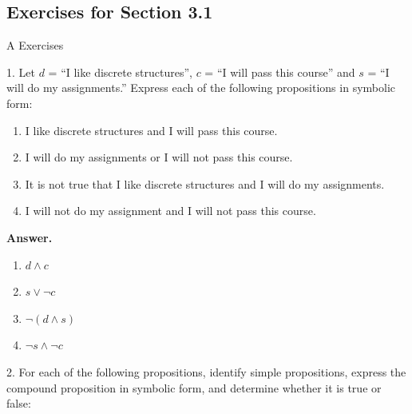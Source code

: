 \documentclass[10pt,]{book}
\theoremstyle{plain}
\theoremstyle{definition}
\theoremstyle{definition}
\theoremstyle{definition}
\theoremstyle{definition}
\begin{document}
\subsection[Exercises for Section 3.1 ]{Exercises for Section 3.1 }\label{exercises-3.1}
\hypertarget{exercisegroup-1}{}\typeout{************************************************}
\typeout{************************************************}
A Exercises%
\begin{exercisegroup}
\item[1.]\hypertarget{exercise-1}{}Let \(d\) = ``I like discrete structures'', \(c\) = ``I will pass this course'' and \(s\) = ``I will do my assignments.''  Express each of the following propositions in symbolic form:%
\par
\leavevmode%
\begin{enumerate}[label=\alph*]
\item\hypertarget{li-19}{}I like discrete structures and I will pass this course.%
\item\hypertarget{li-20}{}I will do my assignments or I will not pass this course.%
\item\hypertarget{li-21}{}It is not true that I like discrete structures and I will do my assignments.%
\item\hypertarget{li-22}{}I will not do my assignment and I will not pass this course.%
\end{enumerate}
%
\par\smallskip
\par\smallskip
\noindent\textbf{Answer.}\hypertarget{answer-1}{}\quad
\leavevmode%
\begin{multicols}{2}
\begin{enumerate}[label=\alph*]
\item\hypertarget{li-23}{} \(d\land c\)%
\item\hypertarget{li-24}{} \(s\lor \neg c\)%
\item\hypertarget{li-25}{} \(\neg (d\land s)\) %
\item\hypertarget{li-26}{} \(\neg s\land \neg c\)%
\end{enumerate}
\end{multicols}
%
\item[2.]\hypertarget{exercise-2}{}
For each of the following propositions, identify simple propositions, express the compound proposition in symbolic form, and determine whether it is true or false:%
\par
\leavevmode%
\begin{enumerate}[label=\alph*]

\end{enumerate}
\end{exercisegroup}
\end{document}
